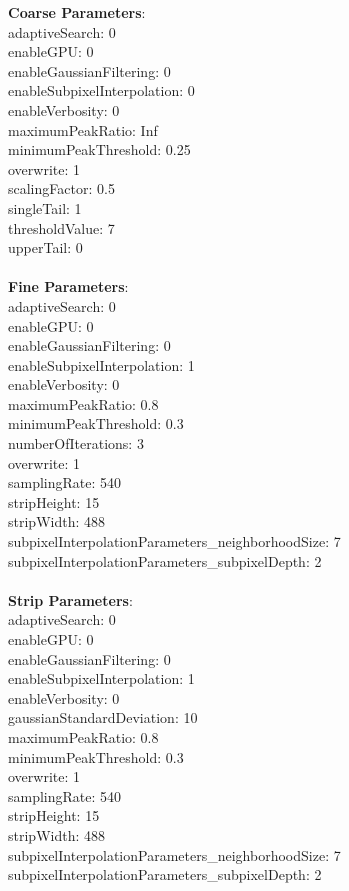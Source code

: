 \documentclass[11pt]{article}
\begin{document}
\textbf{Coarse Parameters}: \\
adaptiveSearch: 0\\
enableGPU: 0\\
enableGaussianFiltering: 0\\
enableSubpixelInterpolation: 0\\
enableVerbosity: 0\\
maximumPeakRatio: Inf\\
minimumPeakThreshold: 0.25\\
overwrite: 1\\
scalingFactor: 0.5\\
singleTail: 1\\
thresholdValue: 7\\
upperTail: 0\\
\\
\textbf{Fine Parameters}: \\
adaptiveSearch: 0\\
enableGPU: 0\\
enableGaussianFiltering: 0\\
enableSubpixelInterpolation: 1\\
enableVerbosity: 0\\
maximumPeakRatio: 0.8\\
minimumPeakThreshold: 0.3\\
numberOfIterations: 3\\
overwrite: 1\\
samplingRate: 540\\
stripHeight: 15\\
stripWidth: 488\\
subpixelInterpolationParameters\_neighborhoodSize: 7\\
subpixelInterpolationParameters\_subpixelDepth: 2\\
\\
\textbf{Strip Parameters}: \\
adaptiveSearch: 0\\
enableGPU: 0\\
enableGaussianFiltering: 0\\
enableSubpixelInterpolation: 1\\
enableVerbosity: 0\\
gaussianStandardDeviation: 10\\
maximumPeakRatio: 0.8\\
minimumPeakThreshold: 0.3\\
overwrite: 1\\
samplingRate: 540\\
stripHeight: 15\\
stripWidth: 488\\
subpixelInterpolationParameters\_neighborhoodSize: 7\\
subpixelInterpolationParameters\_subpixelDepth: 2\\
\\
\newpage
\end{document}
